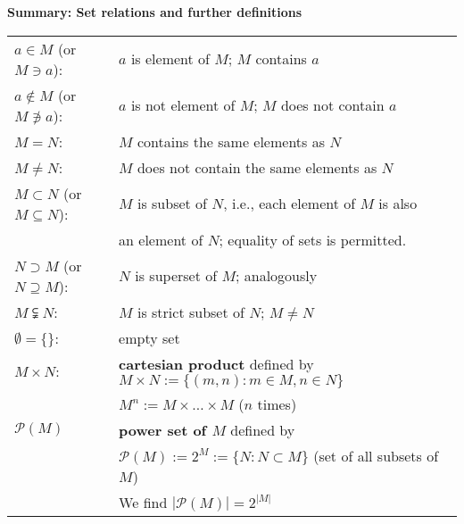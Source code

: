 \begin{frame}
	\textbf{\large Summary: Set relations and further definitions}\\
	\vspace{0.2cm}
	\begin{table}[h] \color{defgruen}
		\begin{tabular}[t]{ll}
			$a \in M$ (or $M \ni a$): & $a$ is element of $M$; $M$ contains $a$\\\vspace{0.2cm}
			$a \not\in M$ (or $M \not\ni a$): & $a$ is not element of $M$; $M$ does not contain $a$\\[3pt]
			$M=N$: & $M$ contains the same elements as $N$\\\vspace{0.2cm}
			$M\not=N$: & $M$ does not contain the same elements as $N$\\\vspace{0.2cm}
			$M \subset N$ (or $M\subseteq N$): & $M$ is subset of $N$, i.e., each element of $M$ is also \\\vspace{0.2cm}
			& an element of $N$; equality of sets is permitted.\\\vspace{0.2cm}
			$N \supset M$ (or $N\supseteq M$): & $N$ is superset of $M$; analogously\\\vspace{0.2cm}
			$M \subsetneqq N$: & $M$ is strict subset of $N$; $M\not=N$\\\vspace{0.2cm}
			$\emptyset = \{\}$: & empty set\\\vspace{0.2cm}
			$M \times N$: & \textbf{cartesian product} defined by 
			$M \times N :=\{(m,n)\colon m\in M,n\in N  \}$\\\vspace{0.4cm}
			& $M^n := M \times \ldots \times M$ ($n$ times)\\\vspace{0.2cm}
			$\mathcal{P} (M)$  & \textbf{power set of $M$} defined by\\
			&$\mathcal{P} (M) := 2^M :=\{ N: N\subset M\} $ (set of all subsets of $M$)\\
			&\vspace{0.2cm}We find $|\mathcal{P} (M)| = 2^{|M|}$
		\end{tabular}
	\end{table}
\end{frame}






